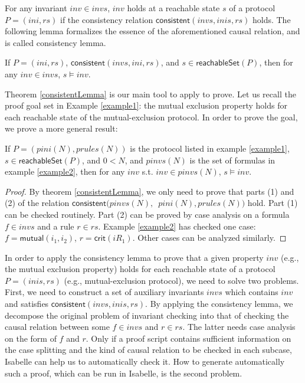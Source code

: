 \documentclass[conference]{IEEEtran}
\newcommand\cai[1]{\textcolor{blue}{#1} }
\begin{document}
{\vspace{-10pt}
For any invariant $inv \in invs$, $inv$ holds at a reachable state $s$  of a protocol $P=(ini,rs)$  if the consistency relation
$\mathsf{consistent}( invs, inis, rs)$ holds. %
The following lemma formalizes the essence of the aforementioned causal relation, and is called consistency lemma.
\vspace{-5pt}
\begin{theorem}\label{consistentLemma}%
 If $P=(ini,rs)$, $\mathsf{consistent}( invs, ini, rs)$, and $s  \in \mathsf{reachableSet}(P)$, %
 then   for any $inv \in invs$, $s \models inv $.
\end{theorem}
\vspace{-10pt}


Theorem \ref{consistentLemma} is our main tool to apply to prove. Let us recall the proof goal set in Example \ref{example1}:  the mutual exclusion property holds for each reachable state of the mutual-exclusion protocol. %
In order to prove the goal, we prove a more general result:
\vspace{-5pt}
\begin{lemma} \label{caseSimp}
  If $ P=(pini(N),prules(N))$ is the protocol listed in example \ref{example1},  $s \in \mathsf{reachableSet}(P)$, and $0<N$, and $pinvs(N)$ is the set of formulas in example \ref{example2},   then for any $inv$ s.t. $inv \in pinvs(N)$, $s\models inv $.
\end{lemma}
\vspace{-5pt}
\begin{proof} By theorem \ref{consistentLemma}, we only need
to prove that parts (1) and (2) of
 the relation $\mathsf{consistent}( pinvs(N), $\ $pini(N), prules(N))$   hold. Part (1) can be checked routinely. Part (2) can be proved by case analysis on a formula $f\in invs$ and a rule $r \in rs$. Example \ref{example2} has checked one case: $f=\mathsf{mutual} (i_1,i_2)$, $r=\mathsf{crit}(iR_1)$. Other cases can be analyzed similarly.
 \end{proof}


In order to  apply the consistency lemma to prove that a given property $inv$ (e.g., the mutual exclusion property) holds for each reachable state of a protocol $P=(inis,rs)$ (e.g., mutual-exclusion protocol), we need to solve two problems. First, we need to construct a set of auxiliary invariants $invs$ which contains $inv$ and satisfies  $\mathsf{consistent}( invs, inis, rs)$.  By applying the consistency lemma, we  decompose the original problem of invariant checking into that of checking the causal relation between some $f\in invs$ and $r \in rs$. The latter needs   case analysis on the form of $f$ and $r$.  Only if a proof script contains sufficient information on the case splitting and  the kind of causal relation to be checked in each subcase, Isabelle can help us to automatically  check it. How to  generate automatically such a proof, which can be run in Isabelle, is the second problem.

}
\end{document}
